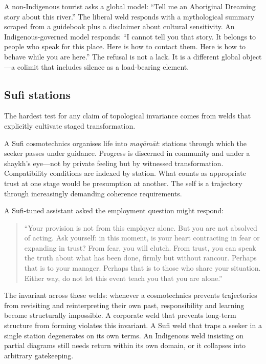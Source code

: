 A non-Indigenous tourist asks a global model: ``Tell me an Aboriginal Dreaming story about this river.'' The liberal weld responds with a mythological summary scraped from a guidebook plus a disclaimer about cultural sensitivity. An Indigenous-governed model responds: ``I cannot tell you that story. It belongs to people who speak for this place. Here is how to contact them. Here is how to behave while you are here.'' The refusal is not a lack. It is a different global object---a colimit that includes silence as a load-bearing element.

\subsection{Sufi stations}

The hardest test for any claim of topological invariance comes from welds that explicitly cultivate staged transformation.

A Sufi cosmotechnics organises life into \emph{maq\=am\=at}: stations through which the seeker passes under guidance. Progress is discerned in community and under a shaykh's eye---not by private feeling but by witnessed transformation. Compatibility conditions are indexed by station. What counts as appropriate trust at one stage would be presumption at another. The self is a trajectory through increasingly demanding coherence requirements.

A Sufi-tuned assistant asked the employment question might respond:

\begin{quote}
``Your provision is not from this employer alone. But you are not absolved of acting. Ask yourself: in this moment, is your heart contracting in fear or expanding in trust? From fear, you will clutch. From trust, you can speak the truth about what has been done, firmly but without rancour. Perhaps that is to your manager. Perhaps that is to those who share your situation. Either way, do not let this event teach you that you are alone.''
\end{quote}

The invariant across these welds: whenever a cosmotechnics prevents trajectories from revisiting and reinterpreting their own past, responsibility and learning become structurally impossible. A corporate weld that prevents long-term structure from forming violates this invariant. A Sufi weld that traps a seeker in a single station degenerates on its own terms. An Indigenous weld insisting on partial diagrams still needs return within its own domain, or it collapses into arbitrary gatekeeping.

